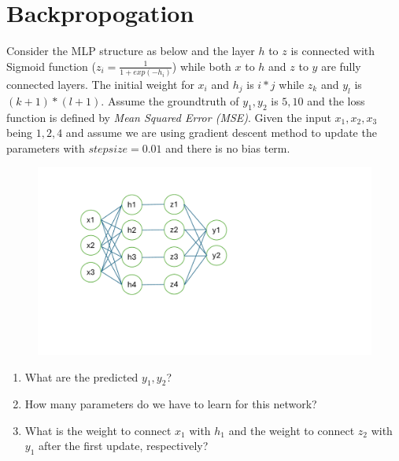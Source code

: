 \documentclass[11pt]{article}
\begin{document}
 \section*{Backpropogation}
 Consider the MLP structure as below and the layer $h$ to $z$ is connected with Sigmoid function ($z_i=\frac{1}{1+exp(-h_i)}$) while both $x$ to $h$ and $z$ to $y$ are fully connected layers. The initial weight for $x_i$ and $h_j$ is $i*j$ while $z_k$ and $y_l$ is $(k+1)*(l+1)$. Assume the groundtruth of $y_1, y_2$ is $5,10$ and the loss function is defined by \textit{Mean Squared Error (MSE)}. Given the input $x_1,x_2,x_3$ being $1, 2, 4$ and assume we are using gradient descent method to update the parameters with $stepsize=0.01$ and there is no bias term.
\begin{figure}[h!]
	\centering
	\includegraphics[width=0.6\linewidth]{backprop}
	\caption{}
	\label{fig:backprop}
\end{figure}
\begin{enumerate}
	\item What are the predicted $y_1, y_2$?
	\item How many parameters do we have to learn for this network?
	\item What is the weight to connect $x_1$ with $h_1$  and the weight to connect $z_2$ with $y_1$ after the first update, respectively?
\end{enumerate}
\end{document}
